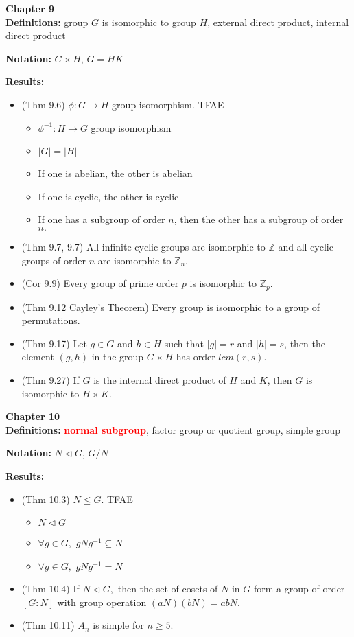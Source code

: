 \documentclass[12pt]{article}
\newcommand{\bbZ}{\mathbb{Z}}
\newcommand{\bfr}[1]{\textbf{\textcolor{red}{#1}}}
\begin{document}
\noindent \textbf{Chapter 9}\\

\noindent \textbf{Definitions:} {group $G$ is isomorphic to group $H$}, external direct product, internal direct product

\noindent \textbf{Notation:} $G \times H$, $G=HK$

\noindent \textbf{Results:}
	\begin{itemize}
	\item (Thm 9.6) $\phi: G \to H$ group isomorphism. TFAE
		\begin{itemize}
		\item $\phi^{-1}: H \to G$ group isomorphism
		\item $|G|=|H|$
		\item If one is abelian, the other is abelian
		\item If one is cyclic, the other is cyclic
		\item If one has a subgroup of order $n$, then the other has a subgroup of order $n.$
		\end{itemize}
	\item (Thm 9.7, 9.7) All infinite cyclic groups are isomorphic to $\bbZ$ and all cyclic groups of order $n$ are isomorphic to $\bbZ_n.$
	\item (Cor 9.9) Every group of prime order $p$ is isomorphic to $\bbZ_p.$
	\item (Thm 9.12 Cayley's Theorem) Every group is isomorphic to a group of permutations.
	\item (Thm 9.17) Let $g \in G$ and $h \in H$ such that $|g|=r$ and $|h|=s$, then the element $(g,h)$ in the group $G \times H$ has order $lcm(r,s).$
	\item (Thm 9.27) If $G$ is the internal direct product of $H$ and $K$, then $G$ is isomorphic to $H \times K.$
	\end{itemize}

\noindent \textbf{Chapter 10}\\

\noindent \textbf{Definitions:} \bfr{normal subgroup}, factor group or quotient group, simple group

\noindent \textbf{Notation:} $N \lhd G$, $G/N$

\noindent \textbf{Results:}
	\begin{itemize}
	\item (Thm 10.3) $N \leq G$. TFAE
		\begin{itemize}
		\item $N \lhd G$
		\item $\forall g \in G,$ $gNg^{-1} \subseteq N$
		\item $\forall g \in G,$ $gNg^{-1} = N$
		\end{itemize}
	\item (Thm 10.4) If $N \lhd G,$ then the set of cosets of $N$ in $G$ form a group of order $[G:N]$ with group operation $(aN)(bN)=abN.$
	\item (Thm 10.11) $A_n$ is simple for $n \geq 5.$
	\end{itemize}
\end{document}
